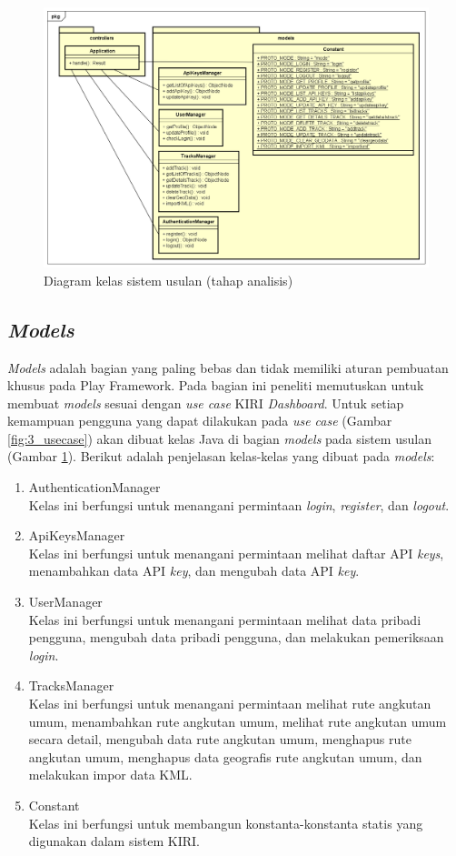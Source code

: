 \begin{figure}[htbp]
	\centering
		\includegraphics[scale=0.47]{Gambar/3_classdiagram_kasar.png}
	\caption{Diagram kelas sistem usulan (tahap analisis)}
	\label{fig:3_classdiagram_kasar}
\end{figure}


\subsection{\textit{Models}}
\label{sec:modelusulan}
\textit{Models} adalah bagian yang paling bebas dan tidak memiliki aturan pembuatan khusus pada Play Framework. Pada bagian ini peneliti memutuskan untuk membuat \textit{models} sesuai dengan \textit{use case} KIRI \textit{Dashboard}. Untuk setiap kemampuan pengguna yang dapat dilakukan pada \textit{use case} (Gambar \ref{fig:3_usecase}) akan dibuat kelas Java di bagian \textit{models} pada sistem usulan (Gambar \ref{fig:3_classdiagram_kasar}). Berikut adalah penjelasan kelas-kelas yang dibuat pada \textit{models}:
\begin{enumerate}
	\item AuthenticationManager\\
	Kelas ini berfungsi untuk menangani permintaan \textit{login}, \textit{register}, dan \textit{logout}.
	\item ApiKeysManager\\
	Kelas ini berfungsi untuk menangani permintaan melihat daftar API \textit{keys}, menambahkan data API \textit{key}, dan mengubah data API \textit{key}.
	\item UserManager\\
	Kelas ini berfungsi untuk menangani permintaan melihat data pribadi pengguna, mengubah data pribadi pengguna, dan melakukan pemeriksaan \textit{login}.
	\item TracksManager\\
	Kelas ini berfungsi untuk menangani permintaan melihat rute angkutan umum, menambahkan rute angkutan umum, melihat rute angkutan umum secara detail, mengubah data rute angkutan umum, menghapus rute angkutan umum, menghapus data geografis rute angkutan umum, dan melakukan impor data KML.
	\item Constant\\
	Kelas ini berfungsi untuk membangun konstanta-konstanta statis yang digunakan dalam sistem KIRI.
\end{enumerate}


